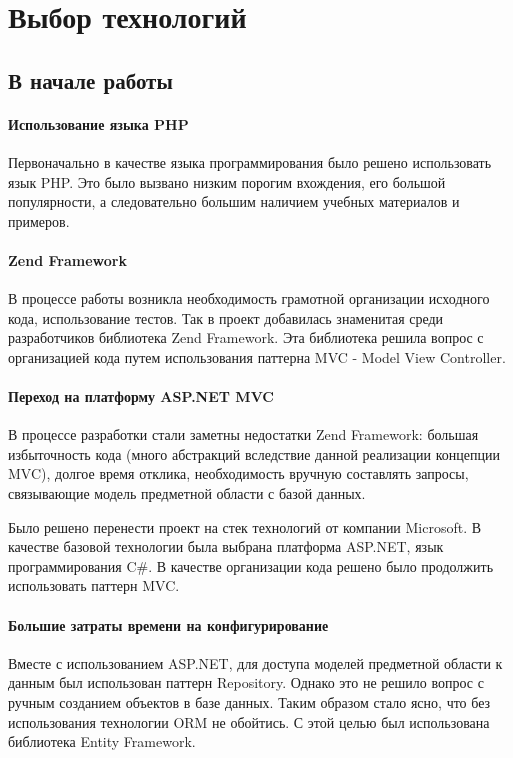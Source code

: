 \newpage
\chapter{Выбор технологий}
\section{В начале работы}
\subsubsection{Использование языка PHP}
Первоначально в качестве языка программирования было решено использовать язык
PHP. Это было вызвано низким порогим вхождения, его большой популярности, а
следовательно большим наличием учебных материалов и примеров.

\subsubsection{Zend Framework}
В процессе работы возникла необходимость грамотной организации исходного кода,
использование тестов. Так в проект добавилась знаменитая среди разработчиков
библиотека Zend Framework. Эта библиотека решила вопрос с организацией кода
путем использования паттерна MVC - Model View Controller.

\subsubsection{Переход на платформу ASP.NET MVC}
В процессе разработки стали заметны недостатки Zend Framework: большая
избыточность кода (много абстракций вследствие данной реализации концепции MVC),
долгое время отклика, необходимость вручную составлять запросы, связывающие
модель предметной области с базой данных.

Было решено перенести проект на стек технологий от компании Microsoft. В
качестве базовой технологии была выбрана платформа  ASP.NET, язык
программирования C\#. В качестве организации кода решено было продолжить
использовать паттерн MVC.

\subsubsection{Большие затраты времени на конфигурирование}
Вместе с использованием ASP.NET, для доступа моделей предметной области к данным
был использован паттерн Repository. Однако это не решило вопрос с ручным
созданием объектов в базе данных. Таким образом  стало ясно, что без
использования технологии ORM не обойтись. С этой целью был использована
библиотека Entity Framework.

